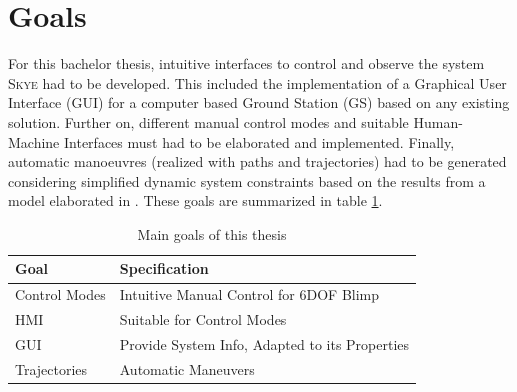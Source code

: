 \section{Goals}
\label{sec:goals}
For this bachelor thesis, intuitive interfaces to control and observe the system \textsc{Skye} had to be developed. This included the implementation of a Graphical User Interface (GUI) for a computer based Ground Station (GS) based on any existing solution. Further on, different manual control modes and suitable Human-Machine Interfaces must had to be elaborated and implemented. Finally, automatic manoeuvres  (realized with paths and trajectories) had to be generated considering simplified dynamic system constraints based on the results from a model elaborated in \cite{weichart}. These goals are summarized in table \ref{tab:goals}. \\

\begin{table}[H]
\begin{center}
 \begin{tabular}{ll}
 \hline
 Goal & Specification  \\ \hline \hline
 Control Modes 	& 	Intuitive Manual Control for 6DOF Blimp \\
 HMI			&	Suitable for Control Modes \\
 GUI         	& 	Provide System Info, Adapted to its Properties \\
 Trajectories   & 	Automatic Maneuvers \\
 \hline
 \end{tabular}
 \caption{Main goals of this thesis}\vspace{1ex}
 \label{tab:goals}
\end{center}
\end{table}


